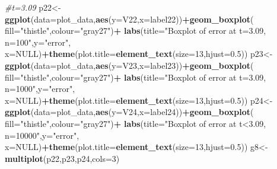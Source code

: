 \documentclass[
]{article}
\newenvironment{Shaded}{\begin{snugshade}}{\end{snugshade}}
\newcommand{\CommentTok}[1]{\textcolor[rgb]{0.56,0.35,0.01}{\textit{#1}}}
\newcommand{\DataTypeTok}[1]{\textcolor[rgb]{0.13,0.29,0.53}{#1}}
\newcommand{\DecValTok}[1]{\textcolor[rgb]{0.00,0.00,0.81}{#1}}
\newcommand{\FloatTok}[1]{\textcolor[rgb]{0.00,0.00,0.81}{#1}}
\newcommand{\KeywordTok}[1]{\textcolor[rgb]{0.13,0.29,0.53}{\textbf{#1}}}
\newcommand{\NormalTok}[1]{#1}
\newcommand{\OperatorTok}[1]{\textcolor[rgb]{0.81,0.36,0.00}{\textbf{#1}}}
\newcommand{\OtherTok}[1]{\textcolor[rgb]{0.56,0.35,0.01}{#1}}
\newcommand{\StringTok}[1]{\textcolor[rgb]{0.31,0.60,0.02}{#1}}
\begin{document}
\begin{Shaded}
\begin{Highlighting}[]
\CommentTok{#t=3.09}
\NormalTok{p22<-}\KeywordTok{ggplot}\NormalTok{(}\DataTypeTok{data=}\NormalTok{plot_data,}\KeywordTok{aes}\NormalTok{(}\DataTypeTok{y=}\NormalTok{V22,}\DataTypeTok{x=}\NormalTok{label22))}\OperatorTok{+}\KeywordTok{geom_boxplot}\NormalTok{(}
  \DataTypeTok{fill=}\StringTok{"thistle"}\NormalTok{,}\DataTypeTok{colour=}\StringTok{"gray27"}\NormalTok{)}\OperatorTok{+}
\StringTok{  }\KeywordTok{labs}\NormalTok{(}\DataTypeTok{title=}\StringTok{"Boxplot of error at t=3.09, n=100"}\NormalTok{,}\DataTypeTok{y=}\StringTok{"error"}\NormalTok{,}
       \DataTypeTok{x=}\OtherTok{NULL}\NormalTok{)}\OperatorTok{+}\KeywordTok{theme}\NormalTok{(}\DataTypeTok{plot.title=}\KeywordTok{element_text}\NormalTok{(}\DataTypeTok{size=}\DecValTok{13}\NormalTok{,}\DataTypeTok{hjust=}\FloatTok{0.5}\NormalTok{))}
\NormalTok{p23<-}\KeywordTok{ggplot}\NormalTok{(}\DataTypeTok{data=}\NormalTok{plot_data,}\KeywordTok{aes}\NormalTok{(}\DataTypeTok{y=}\NormalTok{V23,}\DataTypeTok{x=}\NormalTok{label23))}\OperatorTok{+}\KeywordTok{geom_boxplot}\NormalTok{(}
  \DataTypeTok{fill=}\StringTok{"thistle"}\NormalTok{,}\DataTypeTok{colour=}\StringTok{"gray27"}\NormalTok{)}\OperatorTok{+}
\StringTok{  }\KeywordTok{labs}\NormalTok{(}\DataTypeTok{title=}\StringTok{"Boxplot of error at t=3.09, n=1000"}\NormalTok{,}\DataTypeTok{y=}\StringTok{"error"}\NormalTok{,}
       \DataTypeTok{x=}\OtherTok{NULL}\NormalTok{)}\OperatorTok{+}\KeywordTok{theme}\NormalTok{(}\DataTypeTok{plot.title=}\KeywordTok{element_text}\NormalTok{(}\DataTypeTok{size=}\DecValTok{13}\NormalTok{,}\DataTypeTok{hjust=}\FloatTok{0.5}\NormalTok{))}
\NormalTok{p24<-}\KeywordTok{ggplot}\NormalTok{(}\DataTypeTok{data=}\NormalTok{plot_data,}\KeywordTok{aes}\NormalTok{(}\DataTypeTok{y=}\NormalTok{V24,}\DataTypeTok{x=}\NormalTok{label24))}\OperatorTok{+}\KeywordTok{geom_boxplot}\NormalTok{(}
  \DataTypeTok{fill=}\StringTok{"thistle"}\NormalTok{,}\DataTypeTok{colour=}\StringTok{"gray27"}\NormalTok{)}\OperatorTok{+}
\StringTok{  }\KeywordTok{labs}\NormalTok{(}\DataTypeTok{title=}\StringTok{"Boxplot of error at t<3.09, n=10000"}\NormalTok{,}\DataTypeTok{y=}\StringTok{"error"}\NormalTok{,}
       \DataTypeTok{x=}\OtherTok{NULL}\NormalTok{)}\OperatorTok{+}\KeywordTok{theme}\NormalTok{(}\DataTypeTok{plot.title=}\KeywordTok{element_text}\NormalTok{(}\DataTypeTok{size=}\DecValTok{13}\NormalTok{,}\DataTypeTok{hjust=}\FloatTok{0.5}\NormalTok{))}
\NormalTok{g8<-}\KeywordTok{multiplot}\NormalTok{(p22,p23,p24,}\DataTypeTok{cols=}\DecValTok{3}\NormalTok{)}


\end{Highlighting}
\end{Shaded}
\end{document}
